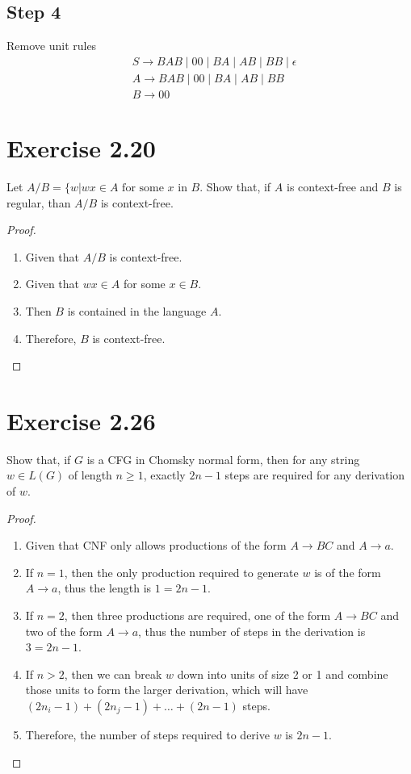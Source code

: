 \documentclass{article}
\begin{document}
\subsection*{Step 4}
  Remove unit rules
	\begin{align*}
		& S \rightarrow BAB \mid 00 \mid BA \mid AB \mid BB \mid \epsilon \\
		& A \rightarrow BAB \mid 00 \mid BA \mid AB \mid BB\\
		& B \rightarrow 00 
	\end{align*}

\section{Exercise 2.20}

Let $A/B = \{ w | wx \in A \text{ for some } x \text{ in } B$. Show that, if $A$
is context-free and $B$ is regular, than $A/B$ is context-free.

\begin{proof}
	\mbox{}
	\begin{enumerate}
		\item Given that $A/B$ is context-free.
		\item Given that $wx \in A$ for some $x \in B$.
		\item Then $B$ is contained in the language $A$.
		\item Therefore, $B$ is context-free. \qedhere
	\end{enumerate}
\end{proof}

\section{Exercise 2.26}

Show that, if $G$ is a CFG in Chomsky normal form, then for any string $w \in
L(G)$ of length $n \geq 1$, exactly $2n - 1$ steps are required for any
derivation of $w$.

\begin{proof}
	\mbox{}
	\begin{enumerate}
	  \item Given that CNF only allows productions of the form $A \rightarrow BC$
	  and $A \rightarrow a$.
	  \item If $n = 1$, then the only production required to generate $w$
	  is of the form $A \rightarrow a$, thus the length is $1 = 2n - 1$.
	  \item If $n = 2$, then three productions are required, one of
	  the form $A \rightarrow BC$ and two of the form $A \rightarrow a$, thus the
	  number of steps in the derivation is $3 = 2n - 1$.
	  \item If $n > 2$, then we can break $w$ down into units of size 2 or 1 and
	  combine those units to form the larger derivation, which will have $(2n_i - 1) +
	  (2n_j - 1) + \ldots + (2n - 1)$ steps.
	  \item Therefore, the number of steps required to derive $w$ is $2n - 1$.
	  \qedhere
	\end{enumerate}
\end{proof}
\end{document}
